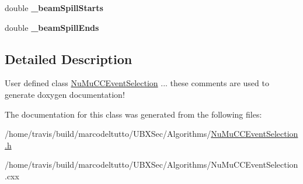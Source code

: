 \begin{DoxyCompactItemize}
\item 
\hypertarget{classubana_1_1NuMuCCEventSelection_af08a0c70e21fbef10efd34dde2fe7d83}{double {\bfseries \-\_\-beam\-Spill\-Starts}}\label{classubana_1_1NuMuCCEventSelection_af08a0c70e21fbef10efd34dde2fe7d83}

\item 
\hypertarget{classubana_1_1NuMuCCEventSelection_a2a52cfd60173c161bf9169cf26964eea}{double {\bfseries \-\_\-beam\-Spill\-Ends}}\label{classubana_1_1NuMuCCEventSelection_a2a52cfd60173c161bf9169cf26964eea}

\end{DoxyCompactItemize}


\subsection{Detailed Description}
User defined class \hyperlink{classubana_1_1NuMuCCEventSelection}{Nu\-Mu\-C\-C\-Event\-Selection} ... these comments are used to generate doxygen documentation! 

The documentation for this class was generated from the following files\-:\begin{DoxyCompactItemize}
\item 
/home/travis/build/marcodeltutto/\-U\-B\-X\-Sec/\-Algorithms/\hyperlink{NuMuCCEventSelection_8h}{Nu\-Mu\-C\-C\-Event\-Selection.\-h}\item 
/home/travis/build/marcodeltutto/\-U\-B\-X\-Sec/\-Algorithms/Nu\-Mu\-C\-C\-Event\-Selection.\-cxx\end{DoxyCompactItemize}

